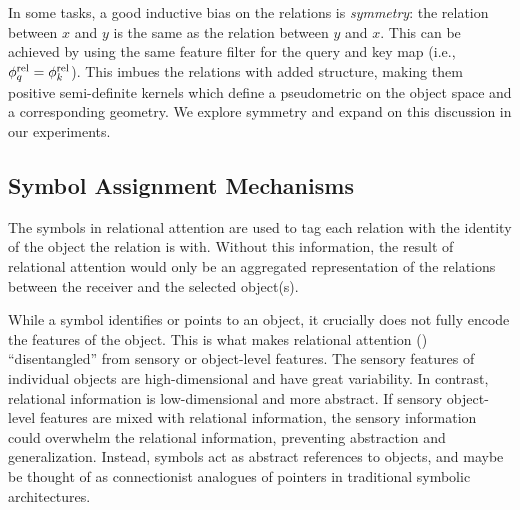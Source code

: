 In some tasks, a good inductive bias on the relations is \textit{symmetry}: the relation between $x$ and $y$ is the same as the relation between $y$ and $x$. This can be achieved by using the same feature filter for the query and key map (i.e., $\phi_q^{\mathrm{rel}} = \phi_k^{\mathrm{rel}}$). This imbues the relations with added structure, making them positive semi-definite kernels which define a pseudometric on the object space and a corresponding geometry. We explore symmetry and expand on this discussion in our experiments.

\subsection{Symbol Assignment Mechanisms}

The symbols in relational attention are used to tag each relation with the identity of the object the 
relation is with. Without this information, the result of relational attention would only be an aggregated representation of the relations between the receiver and the selected object(s).

While a symbol identifies or points to an object, it crucially does not fully encode the features of the object. This is what makes relational attention () ``disentangled'' from sensory or object-level features. The sensory features of individual objects are high-dimensional and have great variability. In contrast, relational information is low-dimensional and more abstract. If sensory object-level features are mixed with relational information, the sensory information could overwhelm the relational information, preventing abstraction and generalization. Instead, symbols act as abstract references to objects, and maybe be thought of as connectionist analogues of pointers in traditional symbolic architectures.

